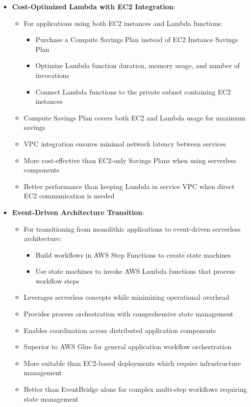 \documentclass[11pt,a4paper]{report}
\begin{document}
\begin{itemize}
\begin{itemize}
  \item More cost-effective than containerization on ECS/Fargate for very short-duration tasks
  \item Particularly valuable for jobs with low memory requirements (e.g., 1 GB or less)
\end{itemize}
  \item \textbf{Cost-Optimized Lambda with EC2 Integration}:
\begin{itemize}
  \item For applications using both EC2 instances and Lambda functions:
\begin{itemize}
  \item Purchase a Compute Savings Plan instead of EC2 Instance Savings Plan
  \item Optimize Lambda function duration, memory usage, and number of invocations
  \item Connect Lambda functions to the private subnet containing EC2 instances
\end{itemize}
  \item Compute Savings Plan covers both EC2 and Lambda usage for maximum savings
  \item VPC integration ensures minimal network latency between services
  \item More cost-effective than EC2-only Savings Plans when using serverless components
  \item Better performance than keeping Lambda in service VPC when direct EC2 communication is needed
\end{itemize}
  \item \textbf{Event-Driven Architecture Transition}:
\begin{itemize}
  \item For transitioning from monolithic applications to event-driven serverless architecture:
\begin{itemize}
  \item Build workflows in AWS Step Functions to create state machines
  \item Use state machines to invoke AWS Lambda functions that process workflow steps
\end{itemize}
  \item Leverages serverless concepts while minimizing operational overhead
  \item Provides process orchestration with comprehensive state management
  \item Enables coordination across distributed application components
  \item Superior to AWS Glue for general application workflow orchestration
  \item More suitable than EC2-based deployments which require infrastructure management
  \item Better than EventBridge alone for complex multi-step workflows requiring state management
\end{itemize}
\end{itemize}
\end{document}
